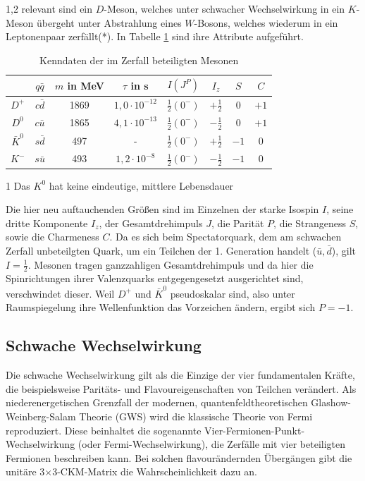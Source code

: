 \documentclass[11pt,a4paper,twoside]{report}
\begin{document}
\begin{spacing}{1,2}
relevant sind ein $D$-Meson, welches unter schwacher Wechselwirkung in ein $K$-Meson übergeht unter Abstrahlung eines $W$-Bosons, welches wiederum in ein 
Leptonenpaar zerfällt(*). In Tabelle \ref{tab_DKMeson} sind ihre Attribute \cite{PDG} aufgeführt.
\begin{table}[H]
\begin{threeparttable}[H]
\begin{tabular}{c|ccc|cccc} \toprule 
  & $q\bar q$ &  $m$ in MeV & $\tau$ in s & $I(J^P)$ & $I_z$ & $S$ & $C$\\
 \midrule
  $D^+$ & $c\bar d$ & 1869 & $1,0\cdot10^{-12}$ & $\frac12(0^-)$ & $+\frac12$ & 0 & $+1$\\
  $D^0$ & $c\bar u$ & 1865 & $4,1\cdot10^{-13}$  & $\frac12(0^-)$ & $-\frac12$ & 0 & $+1$\\
  $\bar K^0$ & $s\bar d$ & 497 & -\tnote{1} & $\frac12(0^-)$ & $+\frac12$ & $-1$& 0\\
  $K^-$ & $s\bar u $ & 493 & $1,2\cdot10^{-8}$ & $\frac12(0^-)$ & $-\frac12$ & $-1$ & 0
\\\bottomrule \bottomrule
 \end{tabular}
 \begin{tablenotes}
 \item[1] \small{Das $K^0$ hat keine eindeutige, mittlere Lebensdauer}
  \end{tablenotes}
\caption{Kenndaten der im Zerfall beteiligten Mesonen}
\label{tab_DKMeson}
\end{threeparttable}
\end{table}
\noindent
Die hier neu auftauchenden Größen sind im Einzelnen der starke Isospin $I$, seine dritte Komponente $I_z$, der Gesamtdrehimpuls $J$, die Parität $P$, die
Strangeness $S$, sowie die Charmeness $C$. Da es sich beim Spectatorquark, dem am schwachen Zerfall unbeteilgten Quark, um ein Teilchen der 1. Generation 
handelt ($\bar u, \bar d$), gilt $I = \frac12$.  Mesonen tragen ganzzahligen Gesamtdrehimpuls und da hier die Spinrichtungen ihrer Valenzquarks 
entgegengesetzt ausgerichtet sind, verschwindet dieser. Weil $D^+$ und $\bar K^0$ pseudoskalar sind, also unter Raumspiegelung ihre Wellenfunktion das 
Vorzeichen ändern, ergibt sich $P=-1$.

\subsection{Schwache Wechselwirkung}
\label{sec_schwacheWW}
Die schwache Wechselwirkung gilt als die Einzige der vier fundamentalen Kräfte, die beispielsweise Paritäts- und Flavoureigenschaften von Teilchen verändert.
Als niederenergetischen Grenzfall der modernen, quantenfeldtheoretischen Glashow-Weinberg-Salam Theorie (GWS) wird die klassische Theorie von Fermi 
reproduziert. Diese beinhaltet die
sogenannte Vier-Fermionen-Punkt-Wechselwirkung (oder Fermi-Wechselwirkung), die Zerfälle mit vier beteiligten Fermionen beschreiben kann. Bei solchen
flavourändernden Übergängen gibt die unitäre 3$\times$3-CKM-Matrix die Wahrscheinlichkeit dazu an. 


\end{spacing}
\end{document}
